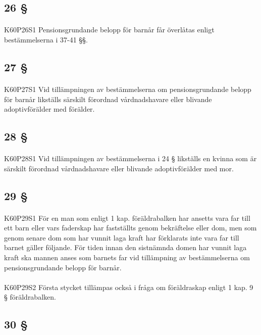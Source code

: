 \documentclass[a4paper,notitlepage,openany,10pt]{book}
\begin{document}
\subsection*{26 §}
\paragraph*{}
{\tiny K60P26S1}
Pensionsgrundande belopp för barnår får överlåtas enligt bestämmelserna i 37-41 §§.
\subsection*{27 §}
\paragraph*{}
{\tiny K60P27S1}
Vid tillämpningen av bestämmelserna om pensionsgrundande belopp för barnår likställs särskilt förordnad vårdnadshavare eller blivande adoptivförälder med förälder.
\subsection*{28 §}
\paragraph*{}
{\tiny K60P28S1}
Vid tillämpningen av bestämmelserna i 24 § likställs en kvinna som är särskilt förordnad vårdnadshavare eller blivande adoptivförälder med mor.
\subsection*{29 §}
\paragraph*{}
{\tiny K60P29S1}
För en man som enligt 1 kap. föräldrabalken har ansetts vara far till ett barn eller vars faderskap har fastställts genom bekräftelse eller dom, men som genom senare dom som har vunnit laga kraft har förklarats inte vara far till barnet gäller följande. För tiden innan den sistnämnda domen har vunnit laga kraft ska mannen anses som barnets far vid tillämpning av bestämmelserna om pensionsgrundande belopp för barnår.
\paragraph*{}
{\tiny K60P29S2}
Första stycket tillämpas också i fråga om föräldraskap enligt 1 kap. 9 § föräldrabalken.
\subsection*{30 §}
\end{document}
